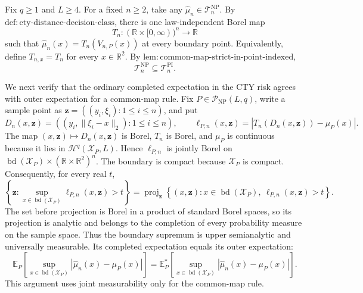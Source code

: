 Fix \(q\geq1\) and \(L\geq4\).  For a fixed \(n\geq2\), take any \(\widehat\mu_n\in\mathcal T_n^{\mathrm{NP}}\).  By \(\mathrm{def:cty\text{-}distance\text{-}decision\text{-}class}\), there is one law-independent Borel map
\[
 T_n:(\mathbb R\times[0,\infty))^n\longrightarrow\mathbb R
\]
such that \(\widehat\mu_n(x)=T_n(V_{n,P}(x))\) at every boundary point.  Equivalently, define \(T_{n,x}=T_n\) for every \(x\in\mathbb R^2\).  By \(\mathrm{lem:common\text{-}map\text{-}strict\text{-}in\text{-}point\text{-}indexed}\),
\[
 \mathcal T_n^{\mathrm{NP}}\subseteq\mathcal T_n^{\mathrm{PI}}.
\]

We next verify that the ordinary completed expectation in the CTY risk agrees with outer expectation for a common-map rule.  Fix \(P\in\mathcal P_{\mathrm{NP}}(L,q)\), write a sample point as \(\mathbf z=((y_i,\xi_i):1\leq i\leq n)\), and put
\[
 D_n(x,\mathbf z)=((y_i,\lVert\xi_i-x\rVert_2):1\leq i\leq n),
 \qquad
 \ell_{P,n}(x,\mathbf z)
 =\left|T_n(D_n(x,\mathbf z))-\mu_P(x)\right|.
\]
The map \((x,\mathbf z)\mapsto D_n(x,\mathbf z)\) is Borel, \(T_n\) is Borel, and \(\mu_P\) is continuous because it lies in \(\mathcal H^q(\mathcal X_P,L)\).  Hence \(\ell_{P,n}\) is jointly Borel on \(\operatorname{bd}(\mathcal X_P)\times(\mathbb R\times\mathbb R^2)^n\).  The boundary is compact because \(\mathcal X_P\) is compact.  Consequently, for every real \(t\),
\[
 \left\{\mathbf z:
   \sup_{x\in\operatorname{bd}(\mathcal X_P)}
   \ell_{P,n}(x,\mathbf z)>t
 \right\}
 =\operatorname{proj}_{\mathbf z}
 \left\{(x,\mathbf z):
   x\in\operatorname{bd}(\mathcal X_P),\ 
   \ell_{P,n}(x,\mathbf z)>t
 \right\}.
\]
The set before projection is Borel in a product of standard Borel spaces, so its projection is analytic and belongs to the completion of every probability measure on the sample space.  Thus the boundary supremum is upper semianalytic and universally measurable.  Its completed expectation equals its outer expectation:
\[
 \mathbb E_P\!\left[
   \sup_{x\in\operatorname{bd}(\mathcal X_P)}
   |\widehat\mu_n(x)-\mu_P(x)|
 \right]
 =
 \mathbb E_P^*\!\left[
   \sup_{x\in\operatorname{bd}(\mathcal X_P)}
   |\widehat\mu_n(x)-\mu_P(x)|
 \right].
\]
This argument uses joint measurability only for the common-map rule.

